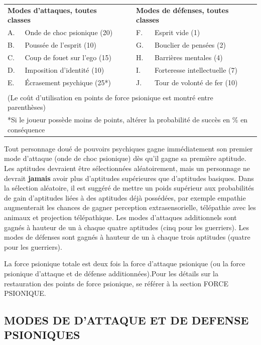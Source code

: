 {{\parindent0.5cm
\begin{tabular}{llcll}
\multicolumn{2}{l}{\textbf{Modes d'attaques, toutes classes}} && \multicolumn{2}{l}{\textbf{Modes de défenses, toutes classes}} \\
A. & Onde de choc psionique (20)  && F. & Esprit vide (1) \\
B. & Poussée de l'esprit (10) 	  && G. & Bouclier de pensées (2) \\
C. & Coup de fouet sur l'ego (15) && H. & Barrières mentales (4) \\
D. & Imposition d'identité (10)   && I. & Forteresse intellectuelle (7) \\
E. & Écrasement psychique (25*)   && J. & Tour de volonté de fer (10) \\
&&&& \\
\multicolumn{5}{p{15cm}}{(Le coût d'utilisation en points de force psionique est montré entre parenthèses)} \\
\multicolumn{5}{p{15cm}}{*Si le joueur possède moins de points, altérer la probabilité de succès en \% en conséquence} \\
\end{tabular}}

\medskip

Tout personnage doué de pouvoirs psychiques gagne immédiatement son premier mode d'attaque (onde de choc psionique) dès qu'il gagne sa première aptitude. Les aptitudes devraient être sélectionnées aléatoirement, mais un personnage ne devrait \textbf{jamais} avoir plus d'aptitudes supérieures que d'aptitudes basiques. Dans la sélection aléatoire, il est suggéré de mettre un poids supérieur aux probabilités de gain d'aptitudes liées à des aptitudes déjà possédées, par exemple empathie augmenterait les chances de gagner perception extrasensorielle, télépathie avec les animaux et projection télépathique. Les modes d'attaques additionnels sont gagnés à hauteur de un à chaque quatre aptitudes (cinq pour les guerriers). Les modes de défenses sont gagnés à hauteur de un à chaque trois aptitudes (quatre pour les guerriers).

\bigskip

La force psionique totale est deux fois la force d'attaque psionique (ou la force psionique d'attaque et de défense additionnées).Pour les détails sur la restauration des points de force psionique, se référer à la section FORCE PSIONIQUE. %

\subsection*{\normalsize MODES DE D'ATTAQUE ET DE DEFENSE PSIONIQUES}

}
